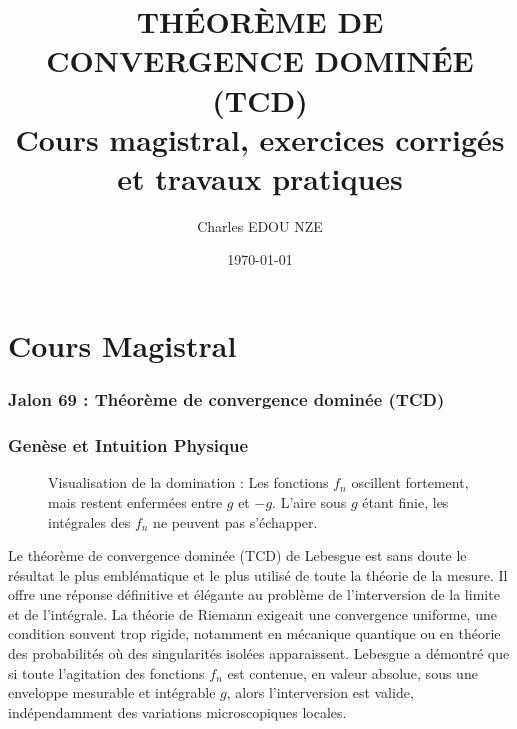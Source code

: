 \documentclass[11pt,a4paper]{article}
\title{\Huge THÉORÈME DE CONVERGENCE DOMINÉE (TCD) \\ \large Cours magistral, exercices corrigés et travaux pratiques}
\author{\Large Charles EDOU NZE}
\date{\today}
\begin{document}
\maketitle
\tableofcontents
\newpage

\part{Cours Magistral}

\section{Jalon 69 : Théorème de convergence dominée (TCD)}

\section{Genèse et Intuition Physique}

\begin{figure}[h]
\centering
{}
\caption{Visualisation de la domination : Les fonctions $f_n$ oscillent fortement, mais restent enfermées entre $g$ et $-g$. L'aire sous $g$ étant finie, les intégrales des $f_n$ ne peuvent pas s'échapper.}
\end{figure}


Le théorème de convergence dominée (TCD) de Lebesgue est sans doute le résultat le plus emblématique et le plus utilisé de toute la théorie de la mesure. Il offre une réponse définitive et élégante au problème de l'interversion de la limite et de l'intégrale.
La théorie de Riemann exigeait une convergence uniforme, une condition souvent trop rigide, notamment en mécanique quantique ou en théorie des probabilités où des singularités isolées apparaissent. Lebesgue a démontré que si toute l'agitation des fonctions $f_n$ est contenue, en valeur absolue, sous une enveloppe mesurable et intégrable $g$, alors l'interversion est valide, indépendamment des variations microscopiques locales.
\end{document}
